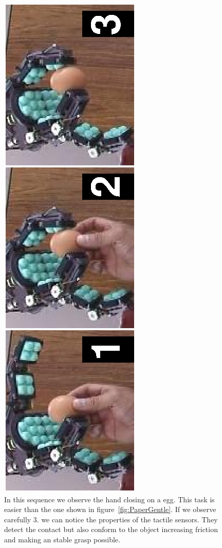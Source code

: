 \begin{figure}[tbp]
\centerline{
\includegraphics[height=\columnwidth, angle=270 ]{./figures/EggSeq.eps}
} \caption[Grabbing an egg]{In this sequence we observe the hand
closing on a egg. This task is easier than the one shown in
figure~\ref{fig:PaperGentle}. If we observe carefully 3. we can
notice the properties of the tactile sensors. They detect the
contact but also conform to the object increasing friction and
making an stable grasp possible.} \label{fig:TouchEgg}
\end{figure}

